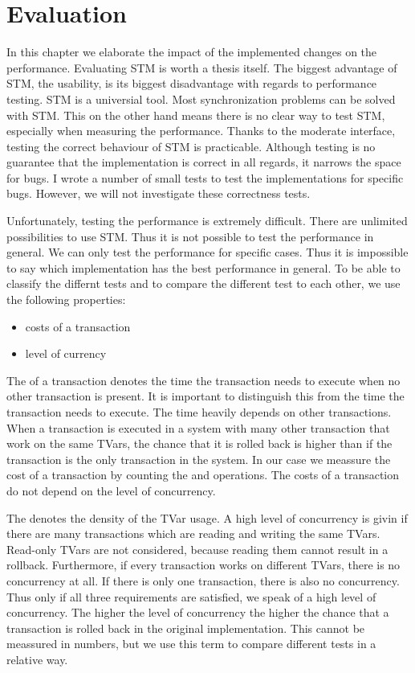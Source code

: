 
\chapter{Evaluation} 

\label{Chapter4}
In this chapter we elaborate the impact of the implemented changes on the performance.
Evaluating STM is worth a thesis itself. The biggest advantage of STM, the usability, is
its biggest disadvantage with regards to performance testing. STM is a universial tool. Most
synchronization problems can be solved with STM. This on the other hand means there
is no clear way to test STM, especially when measuring the performance. Thanks to
the moderate interface, testing the correct behaviour of STM is practicable. Although testing 
is no guarantee that the implementation is correct in all regards, it narrows the 
space for bugs. I wrote a number of small tests to test the implementations for specific bugs.
However, we will not investigate these correctness tests.


Unfortunately, testing the performance is extremely difficult. There are unlimited 
possibilities to use STM. Thus it is not possible to test the performance in general.
We can only test the performance for specific cases. Thus it is impossible to say which 
implementation has the best performance in general. To be able to classify the differnt 
tests and to compare the different test to each other, we use the following properties: 
\begin{itemize}
 \item costs of a transaction
 \item level of currency
\end{itemize}
The  of a transaction denotes the time the transaction needs to execute when no 
other transaction is present.  
It is important to distinguish this from the time the transaction needs to execute. The
time heavily depends on other transactions. When a transaction is executed in a system
with many other transaction that work on the same TVars, the chance that it is rolled 
back is higher than if the transaction is the only transaction in the system. In our case 
we meassure the cost of a transaction by counting the  and  
operations. The costs of a transaction do not depend on the level of concurrency.

The  denotes the density of the TVar usage. A high level of 
concurrency is givin if there are many transactions which are reading and writing the same
TVars. Read-only TVars are not considered, because reading them cannot result in a rollback.
Furthermore, if every transaction works on different TVars, there is no concurrency at all. If there 
is only one transaction, there is also no concurrency. Thus only if all three requirements are satisfied,
we speak of a high level of concurrency. The higher the level of concurrency the higher the chance that
a transaction is rolled back in the original implementation. This cannot be meassured in numbers, but we use this term
to compare different tests in a relative way.

